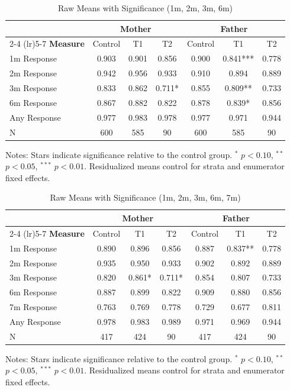 \begin{table}[htbp]
\centering
\caption{Raw Means with Significance (1m, 2m, 3m, 6m)}
\begin{tabular}{lcccccc}
\toprule
& \multicolumn{3}{c}{\textbf{Mother}} & \multicolumn{3}{c}{\textbf{Father}} \\
\cmidrule(lr){2-4} \cmidrule(lr){5-7}
\textbf{Measure} & Control & T1 & T2 & Control & T1 & T2 \\
\midrule
1m Response &  0.903 &  0.901 &  0.856 &  0.900 &  0.841*** &  0.778 \\
2m Response &  0.942 &  0.956 &  0.933 &  0.910 &  0.894 &  0.889 \\
3m Response &  0.833 &  0.862 &  0.711* &  0.855 &  0.809** &  0.733 \\
6m Response &  0.867 &  0.882 &  0.822 &  0.878 &  0.839* &  0.856 \\
Any Response &  0.977 &  0.983 &  0.978 &  0.977 &  0.971 &  0.944 \\
N & 600 & 585 & 90 & 600 & 585 & 90 \\
\bottomrule
\end{tabular}
\begin{tablenotes}
\small
Notes: Stars indicate significance relative to the control group. 
$^{*}$ $p<0.10$, $^{**}$ $p<0.05$, $^{***}$ $p<0.01$.
Residualized means control for strata and enumerator fixed effects.
\end{tablenotes}
\end{table}
\begin{table}[htbp]
\centering
\caption{Raw Means with Significance (1m, 2m, 3m, 6m, 7m)}
\begin{tabular}{lcccccc}
\toprule
& \multicolumn{3}{c}{\textbf{Mother}} & \multicolumn{3}{c}{\textbf{Father}} \\
\cmidrule(lr){2-4} \cmidrule(lr){5-7}
\textbf{Measure} & Control & T1 & T2 & Control & T1 & T2 \\
\midrule
1m Response &  0.890 &  0.896 &  0.856 &  0.887 &  0.837** &  0.778 \\
2m Response &  0.935 &  0.950 &  0.933 &  0.902 &  0.892 &  0.889 \\
3m Response &  0.820 &  0.861* &  0.711* &  0.854 &  0.807 &  0.733 \\
6m Response &  0.887 &  0.899 &  0.822 &  0.909 &  0.880 &  0.856 \\
7m Response &  0.763 &  0.769 &  0.778 &  0.729 &  0.677 &  0.811 \\
Any Response &  0.978 &  0.983 &  0.989 &  0.971 &  0.969 &  0.944 \\
N & 417 & 424 & 90 & 417 & 424 & 90 \\
\bottomrule
\end{tabular}
\begin{tablenotes}
\small
Notes: Stars indicate significance relative to the control group. 
$^{*}$ $p<0.10$, $^{**}$ $p<0.05$, $^{***}$ $p<0.01$.
Residualized means control for strata and enumerator fixed effects.
\end{tablenotes}
\end{table}

